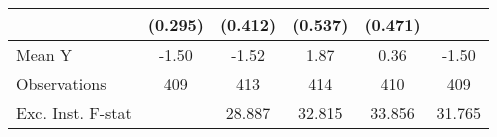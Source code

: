 {\begin{tabular}{l*{5}{c}}
            &     (0.295)         &     (0.412)         &     (0.537)         &     (0.471)         &                     \\
\midrule
Mean Y      &       -1.50         &       -1.52         &        1.87         &        0.36         &       -1.50         \\
Observations&         409         &         413         &         414         &         410         &         409         \\
Exc. Inst. F-stat&                     &      28.887         &      32.815         &      33.856         &      31.765         \\
\bottomrule
\end{tabular}
}
